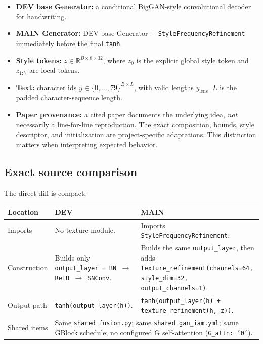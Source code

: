 \documentclass[10pt,a4paper]{article}
\newcommand{\dev}{\textcolor{blue!65!black}{\textbf{DEV}}}
\newcommand{\mainbranch}{\textcolor{orange!55!black}{\textbf{MAIN}}}
\newcommand{\code}[2]{\href{#1}{\texttt{#2}}}
\newcommand{\srcfusion}{\code{https://github.com/rquq/HGGAN_test/blob/dev/networks/fusion.py}{shared fusion.py}}
\newcommand{\srccfg}{\code{https://github.com/rquq/HGGAN_test/blob/dev/configs/gan_iam.yml}{shared gan\_iam.yml}}
\begin{document}
\begin{itemize}[leftmargin=1.45em,itemsep=2pt]
  \item \textbf{DEV base Generator:} a conditional BigGAN-style convolutional decoder for handwriting.
  \item \textbf{MAIN Generator:} DEV base Generator $+$ \texttt{StyleFrequencyRefinement} immediately before the final \texttt{tanh}.
  \item \textbf{Style tokens:} $z\in\mathbb{R}^{B\times8\times32}$, where $z_0$ is the explicit global style token and $z_{1:7}$ are local tokens.
  \item \textbf{Text:} character ids $y\in\{0,\ldots,79\}^{B\times L}$, with valid lengths $y_{\mathrm{lens}}$.  $L$ is the padded character-sequence length.
  \item \textbf{Paper provenance:} a cited paper documents the underlying idea, \emph{not} necessarily a line-for-line reproduction.  The exact composition, bounds, style descriptor, and initialization are project-specific adaptations.  This distinction matters when interpreting expected behavior.
\end{itemize}

\subsection*{Exact source comparison}

The direct diff is compact:

\begin{center}
\small
\begin{tabularx}{\textwidth}{@{}p{}X p{}@{}}
\toprule
Location & \dev{} & \mainbranch{} \\
\midrule
Imports & No texture module. & Imports \texttt{StyleFrequencyRefinement}. \\
Construction & Builds only \texttt{output\_layer = BN $\rightarrow$ ReLU $\rightarrow$ SNConv}. & Builds the same \texttt{output\_layer}, then adds \texttt{texture\_refinement(channels=64, style\_dim=32, output\_channels=1)}. \\
Output path & \texttt{tanh(output\_layer(h))}. & \texttt{tanh(output\_layer(h) + texture\_refinement(h, z))}. \\
Shared items & \multicolumn{2}{l}{Same \srcfusion{}; same \srccfg{}; same GBlock schedule; no configured G self-attention (\texttt{G\_attn: '0'}).} \\
\bottomrule
\end{tabularx}
\end{center}
\end{document}
